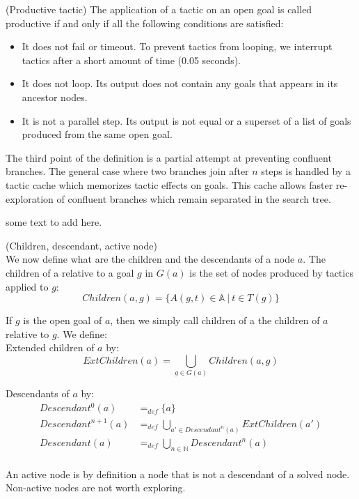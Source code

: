 \documentclass[runningheads,a4paper,draft]{svjour3}
\begin{document}
\begin{definition} (Productive tactic) 
The application of a tactic on an open goal is called productive if and only if 
all the following conditions are satisfied:
\begin{itemize}
\item It does not fail or timeout. To prevent tactics from looping, we 
interrupt tactics after a short amount of time (0.05 seconds). 
\item It does not loop. Its output does not contain any goals that appears in 
its ancestor nodes.
\item It is not a parallel step. Its output is not equal or a superset 
of a list of goals produced from the same open goal.
\end{itemize}

The third point of the definition is a partial attempt at preventing confluent 
branches. The general case where two branches join after $n$ steps is handled 
by a tactic cache which memorizes tactic effects on goals. This
cache allows faster re-exploration of confluent branches which remain 
separated in the search tree.
\end{definition}

some text to add here.

\begin{definition}\label{def:desc}(Children, descendant, active node)\\
We now define what are the children and the descendants of a node $a$. The 
children of a relative to a goal $g$ in $G(a)$ 
is the set of nodes produced by tactics applied to $g$:
  \[Children(a,g) = \lbrace A(g,t)\in \mathbb{A}\ |\ t \in T(g) \rbrace \]

If $g$ is the open goal of $a$, then we simply call children of a the 
children of $a$ relative to $g$. We define:\\

Extended children of $a$ by:
  \[ExtChildren(a) = \bigcup_{g \in G(a)} Children(a,g) \]

Descendants of $a$ by:
\begin{align*}
Descendant^{0}(a) &=_{def} \lbrace a \rbrace \\ 
Descendant^{n+1}(a) &=_{def} \bigcup_{a' \in Descendant^{n}(a)} 
ExtChildren(a') \\
Descendant(a) &=_{def} \bigcup_{n \in \mathbb{N}} Descendant^n(a)\\
\end{align*}


An active node is by definition a node that is not a descendant of a 
solved node. Non-active nodes are not worth exploring.
\end{definition}
\end{document}
